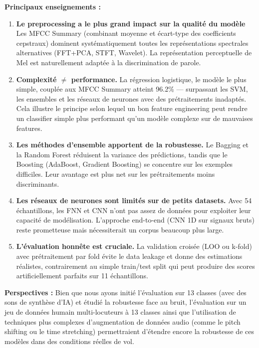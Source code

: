 \documentclass{name}
\begin{document}
\textbf{Principaux enseignements :}

\begin{enumerate}
    \item \textbf{Le preprocessing a le plus grand impact sur la qualité du modèle} Les MFCC Summary (combinant moyenne et écart-type des coefficients cepstraux) dominent systématiquement toutes les représentations spectrales alternatives (FFT+PCA, STFT, Wavelet). La représentation perceptuelle de Mel est naturellement adaptée à la discrimination de parole.
    
    \item \textbf{Complexité $\neq$ performance.} La régression logistique, le modèle le plus simple, couplée aux MFCC Summary atteint 96.2\% — surpassant les SVM, les ensembles et les réseaux de neurones avec des prétraitements inadaptés. Cela illustre le principe selon lequel un bon feature engineering peut rendre un classifier simple plus performant qu'un modèle complexe sur de mauvaises features.
    
    \item \textbf{Les méthodes d'ensemble apportent de la robustesse.} Le Bagging et la Random Forest réduisent la variance des prédictions, tandis que le Boosting (AdaBoost, Gradient Boosting) se concentre sur les exemples difficiles. Leur avantage est plus net sur les prétraitements moins discriminants.
    
    \item \textbf{Les réseaux de neurones sont limités sur de petits datasets.} Avec 54 échantillons, les FNN et CNN n'ont pas assez de données pour exploiter leur capacité de modélisation. L'approche end-to-end (CNN 1D sur signaux bruts) reste prometteuse mais nécessiterait un corpus beaucoup plus large.
    
    \item \textbf{L'évaluation honnête est cruciale.} La validation croisée (LOO ou k-fold) avec prétraitement par fold évite le data leakage et donne des estimations réalistes, contrairement au simple train/test split qui peut produire des scores artificiellement parfaits sur 11 échantillons.
\end{enumerate}

\textbf{Perspectives :} Bien que nous ayons initié l'évaluation sur 13 classes (avec des sons de synthèse d'IA) et étudié la robustesse face au bruit, l'évaluation sur un jeu de données humain multi-locuteurs à 13 classes ainsi que l'utilisation de techniques plus complexes d'augmentation de données audio (comme le pitch shifting ou le time stretching) permettraient d'étendre encore la robustesse de ces modèles dans des conditions réelles de vol.
\end{document}
